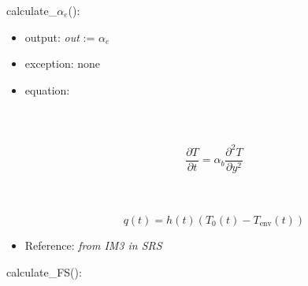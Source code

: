 \documentclass[12pt, titlepage]{article}
\begin{document}
\noindent calculate\_$\alpha_e$():

\begin{itemize}

\item output: \textit{out} := $\alpha_e$
\item exception: none
\item equation:
 \\
\\          
\\
\\          
\begin{equation*}
\frac{\partial T}{\partial t} = \alpha_b \frac{\partial^2 T}{\partial y^2}
\end{equation*}

\\
\\
\begin{equation*}
 q(t) = h(t)(T_0(t) - T_{\text{env}}(t))
 \end{equation*}
         
\item Reference: \textit{from IM3 in SRS}  

\end{itemize}

\noindent calculate\_FS():
\end{document}
